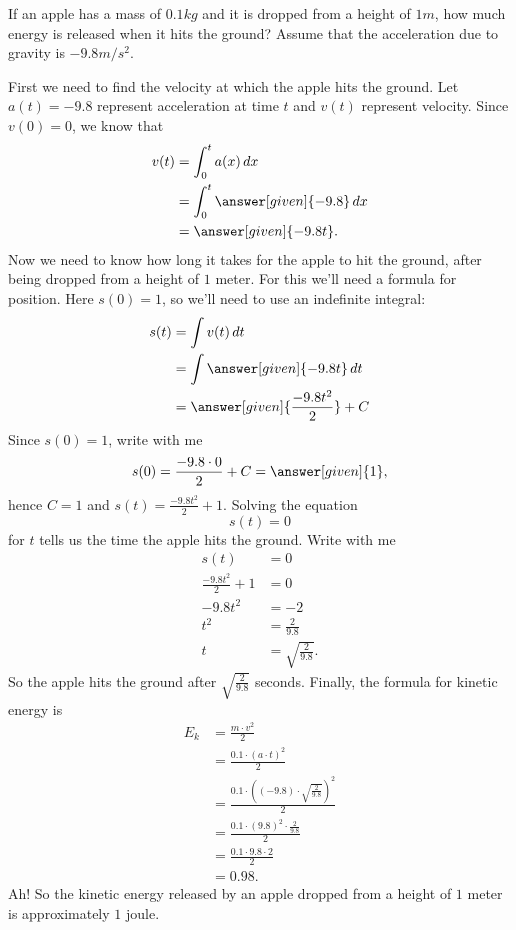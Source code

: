 \documentclass{ximera}
\begin{document}
	
	\begin{example}
		If an apple has a mass of $0.1\unit{kg}$ and it is dropped from a
		height of $1\unit{m}$, how much energy is released when it hits the
		ground? Assume that the acceleration due to gravity is
		$-9.8\unit{m}/\unit{s}^2$.
		\begin{explanation}
			First we need to find the velocity at which the apple hits the
			ground. Let $a(t)=-9.8$ represent acceleration at time $t$ and $v(t)$
			represent velocity. Since $v(0) = 0$, we know that
			\begin{align*}
				v(t) &= \int_0^t a(x) \d x\\
				&= \int_0^t \answer[given]{-9.8} \d x \\
				&= \answer[given]{-9.8t}.
			\end{align*}
			Now we need to know how long it takes for the apple to hit the
			ground, after being dropped from a height of $1$ meter. For this
			we'll need a formula for position. Here $s(0) = 1$, so we'll need
			to use an indefinite integral:
			\begin{align*}
				s(t)&=\int v(t) \d t\\
				&= \int \answer[given]{-9.8t} \d t \\
				&= \answer[given]{\frac{-9.8 t^2}{2}} + C
			\end{align*}
			Since $s(0)= 1$, write with me
			\[
			s(0) = \frac{-9.8 \cdot 0}{2} + C = \answer[given]{1},
			\]
			hence $C =1$ and $s(t) = \frac{-9.8 t^2}{2}+1$. Solving the equation
			\[
			s(t) = 0
			\]
			for $t$ tells us the time the apple hits the ground. Write with me
			\begin{align*}
				s(t) &= 0 \\
				\frac{-9.8 t^2}{2} +1 &= 0\\
				-9.8 t^2 &=-2\\
				t^2 &=\frac{2}{9.8}\\
				t &=\sqrt{\frac{2}{9.8}}.
			\end{align*}
			So the apple hits the ground after $\sqrt{\frac{2}{9.8}}$ seconds.
			Finally, the formula for kinetic energy is
			\begin{align*}
				E_k &= \frac{m \cdot v^2}{2} \\
				&= \frac{0.1 \cdot \left(a\cdot t\right)^2}{2} \\
				&= \frac{0.1 \cdot \left((-9.8)\cdot \sqrt{\frac{2}{9.8}}\right)^2}{2} \\
				&= \frac{0.1 \cdot (9.8)^2\cdot\frac{2}{9.8}}{2} \\
				&= \frac{0.1 \cdot 9.8\cdot 2}{2} \\
				&= 0.98.
			\end{align*}
			Ah! So the kinetic energy released by an apple dropped from a
			height of $1$ meter is approximately $1$ joule.
		\end{explanation}
	\end{example}
	
\end{document}
